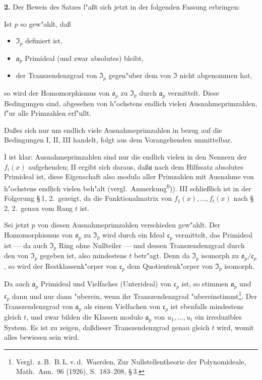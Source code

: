 \medskip\noindent\textbf{2.}
Der Beweis des Satzes l"a\ss t sich jetzt in der folgenden Fassung erbringen:

Ist $p$ so gew"ahlt, da\ss
\begin{itemize}
\item[I.] $\mathfrak{I}_p$ definiert ist,
\item[II.] $\mathfrak{a}_p$ Primideal (und zwar absolutes) bleibt,
\item[III.] der Transzendenzgrad von $\mathfrak{I}_p$ gegen"uber dem von $\mathfrak{I}$ nicht abgenommen hat,
\end{itemize}
so wird der Homomorphismus von $\mathfrak{o}_p$ zu $\mathfrak{I}_p$ durch $\mathfrak{a}_p$ vermittelt. Diese Bedingungen sind, abgesehen von h"ochstens endlich vielen Ausnahmeprimzahlen, f"ur alle Primzahlen erf"ullt.

Da\ss es sich nur um endlich viele Ausnahmeprimzahlen in bezug auf die Bedingungen I, II, III handelt, folgt aus dem Vorangehenden unmittelbar.

I ist klar: Ausnahmeprimzahlen sind nur die endlich vielen in den Nennern der $f_i(x)$ aufgehenden; II ergibt sich daraus, da\ss $\mathfrak{a}$ nach dem Hilfssatz absolutes Primideal ist, diese Eigenschaft also modulo aller Primzahlen mit Ausnahme von h"ochstens endlich vielen beh"alt (vergl.\ Anmerkung\textsuperscript{6})). III schlie\ss lich ist in der Folgerung \S\,1, 2.\ gezeigt, da die Funktionalmatrix von $f_1(x),\ldots,f_t(x)$ nach \S\,2, 2.\ genau vom Rang $t$ ist.

Sei jetzt $p$ von diesen Ausnahmeprimzahlen verschieden gew"ahlt. Der Homomorphismus von $\mathfrak{o}_p$ zu $\mathfrak{I}_p$ wird durch ein Ideal $\mathfrak{c}_p$ vermittelt, das Primideal ist --- da auch $\mathfrak{I}_p$ Ring ohne Nullteiler --- und dessen Transzendenzgrad durch den von $\mathfrak{I}_p$ gegeben ist, also mindestens $t$ betr"agt. Denn da $\mathfrak{I}_p$ isomorph zu $\mathfrak{o}_p/\mathfrak{c}_p$, so wird der Restklassenk"orper von $\mathfrak{c}_p$ dem Quotientenk"orper von $\mathfrak{I}_p$ isomorph.

Da auch $\mathfrak{a}_p$ Primideal und Vielfaches (Unterideal) von $\mathfrak{c}_p$ ist, so stimmen $\mathfrak{a}_p$ und $\mathfrak{c}_p$ dann und nur dann "uberein, wenn ihr Transzendenzgrad "ubereinstimmt\footnote{Vergl.\ z.\,B.\ B.\,L.\,v.\,d.\ Waerden, Zur Nullstellentheorie der Polynomideale, Math.\ Ann.\ 96 (1926), S.\ 183--208, \S\,3.}. Der Transzendenzgrad von $\mathfrak{a}_p$ als einem Vielfachen von $\mathfrak{c}_p$ ist ebenfalls mindestens gleich $t$, und zwar bilden die Klassen modulo $\mathfrak{a}_p$ von $u_1,\ldots,u_t$ ein irreduzibles System. Es ist zu zeigen, da\ss dieser Transzendenzgrad genau gleich $t$ wird, womit alles bewiesen sein wird.

